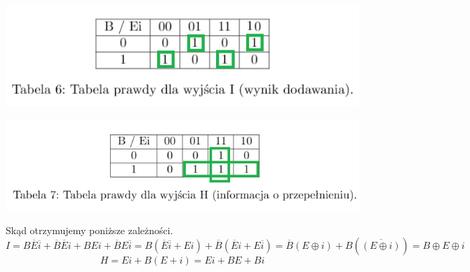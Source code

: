 \documentclass{article}
\begin{document}
            \begin{center}
                \includegraphics[widht=18cm]{reports/img/Z1A_tab_1.png}\\
            \end{center}
            \begin{center}
                \includegraphics[widht=18cm]{reports/img/Z1A_tab_2.png}\\
            \end{center}
            Skąd otrzymujemy poniższe zależności. 
            $$I = B\overline{E}\overline{i} + \overline{B}\overline{E}i + BEi + \overline{B}E\overline{i} = B(\overline{E}\overline{i} + Ei) + \overline{B}(\overline{E}i + E\overline{i}) = \overline{B}(E\oplus i) + B(\overline{(E\oplus i)}) = B\oplus E\oplus i$$
            $$H = Ei + B(E + i) = Ei + BE + Bi$$
\end{document}
